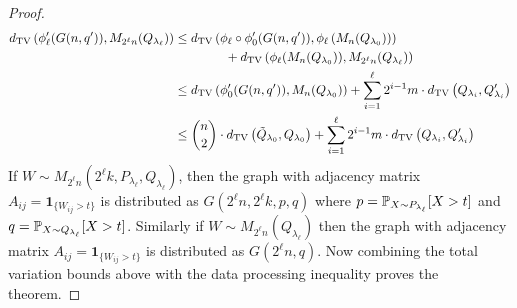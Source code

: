 \begin{proof}
\begin{align*}
d_{\text{TV}}\left( \phi_\ell'(G(n, q')), M_{2^\ell n}(Q_{\lambda_\ell}) \right) &\le d_{\text{TV}}\left( \phi_\ell \circ \phi_0'(G(n, q')), \phi_\ell\left(M_n(Q_{\lambda_0})\right) \right) \\
&\quad \quad \quad \quad + d_{\text{TV}}\left( \phi_\ell(M_n(Q_{\lambda_0})), M_{2^\ell n}(Q_{\lambda_\ell}) \right) \\
&\le d_{\text{TV}}\left( \phi_0'(G(n, q')), M_n(Q_{\lambda_0}) \right) + \sum_{i = 1}^\ell 2^{i-1} m \cdot d_{\text{TV}}\left( Q_{\lambda_i}, Q'_{\lambda_i} \right) \\
&\le \binom{n}{2} \cdot d_{\text{TV}}\left( \tilde{Q}_{\lambda_0}, Q_{\lambda_0} \right) + \sum_{i = 1}^\ell 2^{i-1} m \cdot d_{\text{TV}}\left( Q_{\lambda_i}, Q'_{\lambda_i} \right)
\end{align*}
If $W \sim M_{2^{\ell} n}(2^{\ell} k, P_{\lambda_\ell}, Q_{\lambda_\ell})$, then the graph with adjacency matrix $A_{ij} = \mathbf{1}_{\{W_{ij} > t\}}$ is distributed as $G(2^\ell n, 2^\ell k, p, q)$ where $p = \mathbb{P}_{X \sim P_{\lambda_\ell}}[ X > t]$ and $q = \mathbb{P}_{X \sim Q_{\lambda_\ell}}[ X > t]$. Similarly if $W \sim M_{2^\ell n}(Q_{\lambda_\ell})$ then the graph with adjacency matrix $A_{ij} = \mathbf{1}_{\{W_{ij} > t\}}$ is distributed as $G(2^\ell n, q)$. Now combining the total variation bounds above with the data processing inequality proves the theorem.
\end{proof}

